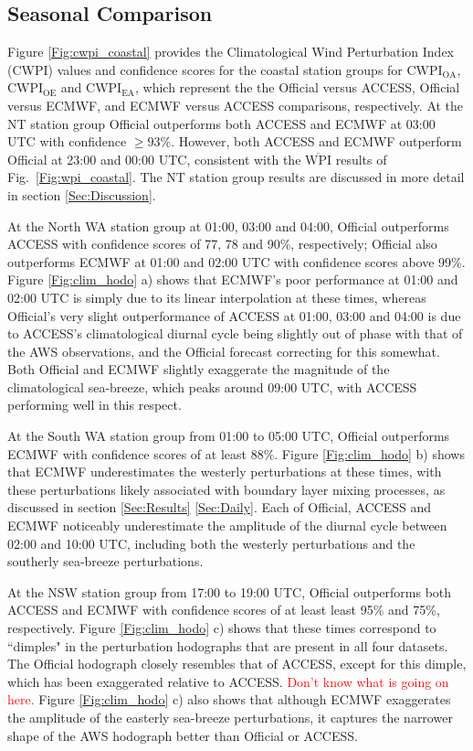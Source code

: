 \documentclass{ametsoc}
\begin{document}
\subsection{Seasonal Comparison}
\label{Sec:Seasonal}
Figure \ref{Fig:cwpi_coastal} provides the Climatological Wind Perturbation Index (CWPI) values and confidence scores for the coastal station groups for $\text{CWPI}_\text{OA}$, $\text{CWPI}_\text{OE}$ and $\text{CWPI}_\text{EA}$, which represent the the Official versus ACCESS, Official versus ECMWF, and ECMWF versus ACCESS comparisons, respectively. At the NT station group Official outperforms both ACCESS and ECMWF at 03:00 UTC with confidence $\geq 93\%$. However, both ACCESS and ECMWF outperform Official at 23:00 and 00:00 UTC, consistent with the $\overline{\text{WPI}}$ results of Fig.~\ref{Fig:wpi_coastal}. The NT station group results are discussed in more detail in section \ref{Sec:Discussion}.

At the North WA station group at 01:00, 03:00 and 04:00, Official outperforms ACCESS with confidence scores of 77, 78 and 90\%, respectively; Official also outperforms ECMWF at 01:00 and 02:00 UTC with confidence scores above 99\%. Figure \ref{Fig:clim_hodo} a) shows that ECMWF's poor performance at 01:00 and 02:00 UTC is simply due to its linear interpolation at these times, whereas Official's very slight outperformance of ACCESS at 01:00, 03:00 and 04:00 is due to ACCESS's climatological diurnal cycle being slightly out of phase with that of the AWS observations, and the Official forecast correcting for this somewhat. Both Official and ECMWF slightly exaggerate the magnitude of the climatological sea-breeze, which peaks around 09:00 UTC, with ACCESS performing well in this respect.

At the South WA station group from 01:00 to 05:00 UTC, Official outperforms ECMWF with confidence scores of at least $88\%$. Figure \ref{Fig:clim_hodo} b) shows that ECMWF underestimates the westerly perturbations at these times, with these perturbations likely associated with boundary layer mixing processes, as discussed in section \ref{Sec:Results} \ref{Sec:Daily}. Each of Official, ACCESS and ECMWF noticeably underestimate the amplitude of the diurnal cycle between 02:00 and 10:00 UTC, including both the westerly perturbations and the southerly sea-breeze perturbations. 

At the NSW station group from 17:00 to 19:00 UTC, Official outperforms both ACCESS and ECMWF with confidence scores of at least least 95\% and 75\%, respectively. Figure \ref{Fig:clim_hodo} c) shows that these times correspond to ``dimples" in the perturbation hodographs that are present in all four datasets. The Official hodograph closely resembles that of ACCESS, except for this dimple, which has been exaggerated relative to ACCESS. \textcolor{red}{Don't know what is going on here.} Figure \ref{Fig:clim_hodo} c) also shows that although ECMWF exaggerates the amplitude of the easterly sea-breeze perturbations, it captures the narrower shape of the AWS hodograph better than Official or ACCESS.
\end{document}
